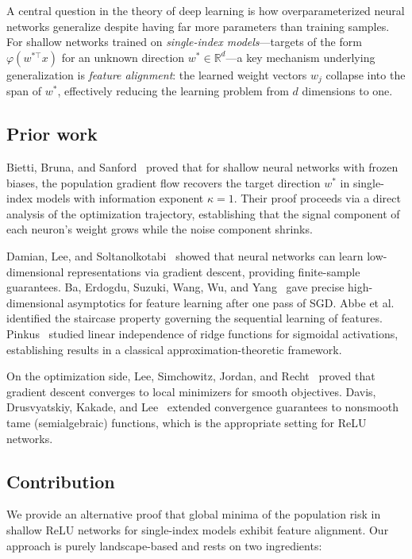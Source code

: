 \documentclass[11pt]{amsart}
\theoremstyle{definition}
\newcommand{\R}{\mathbb{R}}
\begin{document}
A central question in the theory of deep learning is how overparameterized neural networks generalize despite having far more parameters than training samples. For shallow networks trained on \emph{single-index models}---targets of the form $\varphi(w^{*\top} x)$ for an unknown direction $w^* \in \R^d$---a key mechanism underlying generalization is \emph{feature alignment}: the learned weight vectors $w_j$ collapse into the span of $w^*$, effectively reducing the learning problem from $d$ dimensions to one.

\subsection{Prior work}

Bietti, Bruna, and Sanford~\cite{bietti2022} proved that for shallow neural networks with frozen biases, the population gradient flow recovers the target direction $w^*$ in single-index models with information exponent $\kappa = 1$. Their proof proceeds via a direct analysis of the optimization trajectory, establishing that the signal component of each neuron's weight grows while the noise component shrinks.

Damian, Lee, and Soltanolkotabi~\cite{damian2022} showed that neural networks can learn low-dimensional representations via gradient descent, providing finite-sample guarantees. Ba, Erdogdu, Suzuki, Wang, Wu, and Yang~\cite{ba2022} gave precise high-dimensional asymptotics for feature learning after one pass of SGD. Abbe et al.~\cite{abbe2022} identified the staircase property governing the sequential learning of features. Pinkus~\cite{pinkus1999} studied linear independence of ridge functions for sigmoidal activations, establishing results in a classical approximation-theoretic framework.

On the optimization side, Lee, Simchowitz, Jordan, and Recht~\cite{lee2016} proved that gradient descent converges to local minimizers for smooth objectives. Davis, Drusvyatskiy, Kakade, and Lee~\cite{davis2020} extended convergence guarantees to nonsmooth tame (semialgebraic) functions, which is the appropriate setting for ReLU networks.

\subsection{Contribution}

We provide an alternative proof that global minima of the population risk in shallow ReLU networks for single-index models exhibit feature alignment. Our approach is purely landscape-based and rests on two ingredients:
\end{document}
